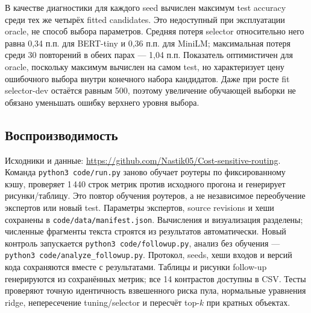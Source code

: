 В качестве диагностики для каждого seed вычислен максимум test
accuracy среди тех же четырёх fitted candidates. Это недоступный
при эксплуатации oracle, не способ выбора параметров.
Средняя потеря selector относительно него равна 0,34 п.п. для
BERT-tiny и 0,36 п.п. для MiniLM; максимальная потеря среди
30 повторений в обеих парах --- 1,04 п.п.
Показатель оптимистичен для oracle, поскольку максимум вычислен
на самом test, но характеризует цену ошибочного выбора внутри
конечного набора кандидатов. Даже при росте fit selector-dev
остаётся равным 500, поэтому увеличение обучающей выборки
не обязано уменьшать ошибку верхнего уровня выбора.

\subsection{Воспроизводимость}
Исходники и данные:
\url{https://github.com/Nastik05/Cost-sensitive-routing}.
Команда \texttt{python3 code/run.py} заново обучает роутеры по
фиксированному кэшу, проверяет 1\,440 строк метрик против исходного
прогона и генерирует рисунки/таблицу. Это повтор обучения роутеров,
а не независимое переобучение экспертов или новый test.
Параметры экспертов, source revisions и хеши сохранены в
\texttt{code/data/manifest.json}. Вычисления и визуализация разделены;
численные фрагменты текста строятся из результатов автоматически.
Новый контроль запускается \texttt{python3 code/followup.py},
анализ без обучения --- \texttt{python3 code/analyze\_followup.py}.
Протокол, seeds, хеши входов и версий кода сохраняются вместе
с результатами. Таблицы и рисунки follow-up генерируются из сохранённых
метрик; все 14 контрастов доступны в CSV. Тесты проверяют точную
идентичность взвешенного риска пула, нормальные уравнения ridge,
непересечение tuning/selector и пересчёт top-$k$ при кратных объектах.
